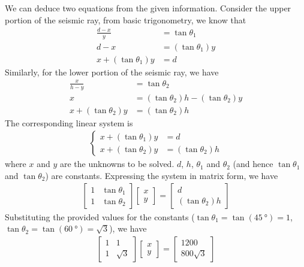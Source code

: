 \begin{solution}
We can deduce two equations from the given information. Consider the upper portion of the seismic ray, from basic trigonometry, we know that 
\begin{align*}
\frac{d-x}{y} &= \tan \theta_1 \\
d-x &= (\tan\theta_1) y \\
x + (\tan\theta_1) y &= d
\end{align*}
Similarly, for the lower portion of the seismic ray, we have
\begin{align*}
\frac{x}{h-y} &= \tan \theta_2 \\
x &= (\tan \theta_2) h - (\tan\theta_2) y \\
x + (\tan\theta_2) y &= (\tan \theta_2) h
\end{align*}
The corresponding linear system is
\begin{align*}
\begin{cases}
x + (\tan\theta_1) y &= d \\
x + (\tan\theta_2) y &= (\tan \theta_2) h
\end{cases}
\end{align*}
where $x$ and $y$ are the unknowns to be solved. $d$, $h$, $\theta_1$ and $\theta_2$ (and hence $\tan\theta_1$ and $\tan\theta_2$) are constants. Expressing the system in matrix form, we have
\begin{align*}
\begin{bmatrix}
1 & \tan\theta_1 \\
1 & \tan\theta_2
\end{bmatrix}
\begin{bmatrix}
x \\
y
\end{bmatrix}
=
\begin{bmatrix}
d \\
(\tan \theta_2) h
\end{bmatrix}
\end{align*}
Substituting the provided values for the constants ($\tan\theta_1 = \tan(\SI{45}{\degree}) = 1$, $\tan\theta_2 = \tan(\SI{60}{\degree}) = \sqrt{3}$), we have
\begin{align*}
\begin{bmatrix}
1 & 1 \\
1 & \sqrt{3}
\end{bmatrix}
\begin{bmatrix}
x \\
y
\end{bmatrix}
=
\begin{bmatrix}
1200 \\
800\sqrt{3}
\end{bmatrix}
\end{align*}
\end{solution}

